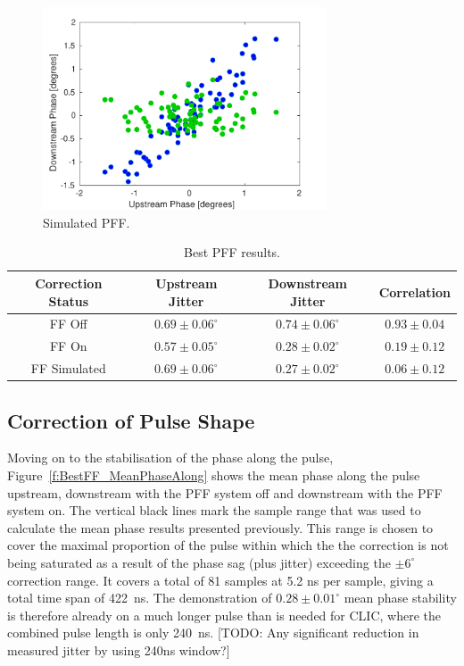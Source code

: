 \begin{figure}
  \centering
  \includegraphics[width=0.75\textwidth]{Figures/feedforward/BestFF_Simulated}
  \caption{Simulated PFF.}
  \label{f:BestFF_Simulated}
\end{figure}


\begin{table}
  \begin{center}
    \begin{tabular}{| c | c | c | c |}
	   \hline
       Correction Status & Upstream Jitter & Downstream Jitter & Correlation \\ \hline
       FF Off & \(0.69\pm0.06^\circ\) & \(0.74\pm0.06^\circ\) & \(0.93\pm0.04\) \\
	   FF On & \(0.57\pm0.05^\circ\) & \(0.28\pm0.02^\circ\) & \(0.19\pm0.12\) \\
	   FF Simulated & \(0.69\pm0.06^\circ\) & \(0.27\pm0.02^\circ\) & \(0.06\pm0.12\) \\ \hline
    \end{tabular}
    \caption{Best PFF results.}
  	\label{t:BestFF}
  \end{center}
\end{table}

\subsection{Correction of Pulse Shape}
\label{ss:bestPulseShape}

Moving on to the stabilisation of the phase along the pulse, Figure~\ref{f:BestFF_MeanPhaseAlong} shows the mean phase along the pulse upstream, downstream with the PFF system off and downstream with the PFF system on. The vertical black lines mark the sample range that was used to calculate the mean phase results presented previously. This range is chosen to cover the maximal proportion of the pulse within which the the correction is not being saturated as a result of the phase sag (plus jitter) exceeding the \(\pm6^\circ\) correction range. It covers a total of 81 samples at 5.2 ns per sample, giving a total time span of 422~ns. The demonstration of \(0.28\pm0.01^\circ\) mean phase stability is therefore already on a much longer pulse than is needed for CLIC, where the combined pulse length is only 240~ns. [TODO: Any significant reduction in measured jitter by using 240ns window?] 

